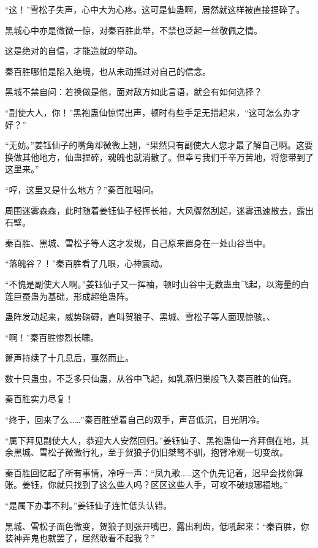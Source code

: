 \begin{this_body}
“这！”雪松子失声，心中大为心疼。这可是仙蛊啊，居然就这样被直接捏碎了。

黑城心中亦是微微一惊，对秦百胜此举，不禁也泛起一丝敬佩之情。

这是绝对的自信，才能造就的举动。

秦百胜哪怕是陷入绝境，也从未动摇过对自己的信念。

黑城不禁自问：若换做是他，面对敌方如此言语，就会有如何选择？

“副使大人，你！”黑袍蛊仙惊愕出声，顿时有些手足无措起来，“这可怎么办才好？”

“无妨。”姜钰仙子的嘴角却微微上翘，“果然只有副使大人您才最了解自己啊。这要换做其他地方，仙蛊捏碎，魂魄也就消散了。但幸亏我们千辛万苦地，将您带到了这里来。”

“哼，这里又是什么地方？”秦百胜喝问。

周围迷雾森森，此时随着姜钰仙子轻挥长袖，大风骤然刮起，迷雾迅速散去，露出石壁。

秦百胜、黑城、雪松子等人这才发现，自己原来置身在一处山谷当中。

“落魄谷？！”秦百胜看了几眼，心神震动。

“不愧是副使大人啊。”姜钰仙子又一挥袖，顿时山谷中无数蛊虫飞起，以海量的白莲巨蚕蛊为基础，形成超绝蛊阵。

蛊阵发动起来，威势磅礴，直叫贺狼子、黑城、雪松子等人面现惊骇。、

“啊！”秦百胜惨烈长啸。

箫声持续了十几息后，戛然而止。

数十只蛊虫，不乏多只仙蛊，从谷中飞起，如乳燕归巢般飞入秦百胜的仙窍。

秦百胜实力尽复！

“终于，回来了么……”秦百胜望着自己的双手，声音低沉，目光阴冷。

“属下拜见副使大人，恭迎大人安然回归。”姜钰仙子、黑袍蛊仙一齐拜倒在地，其余黑城、雪松子微微行礼，至于贺狼子仍旧桀骜不驯，抱臂冷观一切变故。

秦百胜回忆起了所有事情，冷哼一声：“凤九歌……这个仇先记着，迟早会找你算账。姜钰，你就只找到了这么些人吗？区区这些人手，可攻不破琅琊福地。”

“是属下办事不利。”姜钰仙子连忙低头认错。

黑城、雪松子面色微变，贺狼子则张开嘴巴，露出利齿，低吼起来：“秦百胜，你装神弄鬼也就罢了，居然敢看不起我？”

\end{this_body}

